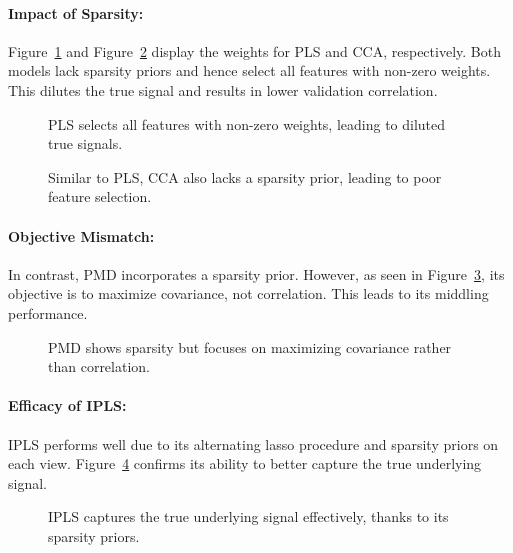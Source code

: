 \paragraph{Impact of Sparsity:}
Figure~\ref{fig:PLS_weights} and Figure~\ref{fig:CCA_weights} display the weights for PLS and CCA, respectively.
Both models lack sparsity priors and hence select all features with non-zero weights.
This dilutes the true signal and results in lower validation correlation.

\begin{figure}[h]
    \centering
    
    \caption{PLS selects all features with non-zero weights, leading to diluted true signals.}
    \label{fig:PLS_weights}
\end{figure}

\begin{figure}[h]
    \centering
    
    \caption{ Similar to PLS, CCA also lacks a sparsity prior, leading to poor feature selection.}
    \label{fig:CCA_weights}
\end{figure}

\paragraph{Objective Mismatch:}
In contrast, PMD incorporates a sparsity prior. However, as seen in Figure~\ref{fig:PMD_weights}, its objective is to maximize covariance, not correlation. This leads to its middling performance.

\begin{figure}[h]
    \centering
    
    \caption{PMD shows sparsity but focuses on maximizing covariance rather than correlation.}
    \label{fig:PMD_weights}
\end{figure}

\paragraph{Efficacy of IPLS:}
IPLS performs well due to its alternating lasso procedure and sparsity priors on each view. Figure~\ref{fig:IPLS_weights} confirms its ability to better capture the true underlying signal.

\begin{figure}[h]
    \centering
    
    \caption{IPLS captures the true underlying signal effectively, thanks to its sparsity priors.}
    \label{fig:IPLS_weights}
\end{figure}

